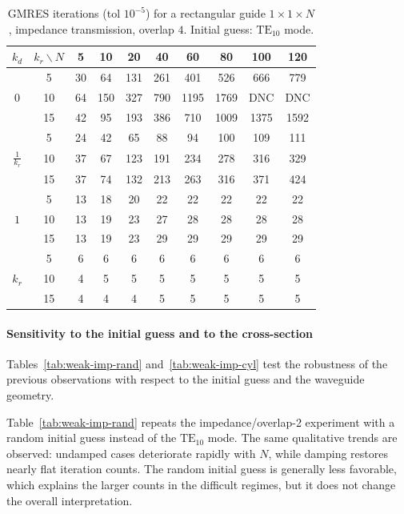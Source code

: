 \documentclass[smallextended]{svjour3}       %
\begin{document}
\begin{table}[h]
\centering
\setlength{\tabcolsep}{3pt}
\renewcommand{\arraystretch}{1.05}
\caption{GMRES iterations (tol \(10^{-5}\)) for a rectangular guide \(1\times 1\times N\),
impedance transmission, overlap \(4\). Initial guess: $\mathrm{TE}_{10}$ mode.}
\label{tab:weak-imp-o4}
\begin{tabular}{|c||c|c|c|c|c|c|c|c|c|}
\hline
$k_d$ & $ k_r \backslash N$ & 5 & 10 & 20 & 40 & 60 & 80 & 100 & 120 \\
\hline
 & 5 & 30 & 64 & 131 & 261 & 401 & 526 & 666 & 779 \\
$0$ & 10 & 64 & 150 & 327 & 790 & 1195 & 1769 & DNC & DNC \\
 & 15 & 42 & 95 & 193 & 386 & 710 & 1009 & 1375 & 1592 \\
\hline\hline
 & 5 & 24 & 42 & 65 & 88 & 94 & 100 & 109 & 111 \\
$\frac{1}{k_r}$ & 10 & 37 & 67 & 123 & 191 & 234 & 278 & 316 & 329 \\
 & 15 & 37 & 74 & 132 & 213 & 263 & 316 & 371 & 424 \\
\hline\hline
 & 5 & 13 & 18 & 20 & 22 & 22 & 22 & 22 & 22 \\
$1$ & 10 & 13 & 19 & 23 & 27 & 28 & 28 & 28 & 28 \\
 & 15 & 13 & 19 & 23 & 29 & 29 & 29 & 29 & 29 \\
\hline\hline
 & 5 & 6 & 6 & 6 & 6 & 6 & 6 & 6 & 6 \\
$k_r$ & 10 & 4 & 5 & 5 & 5 & 5 & 5 & 5 & 5 \\
 & 15 & 4 & 4 & 4 & 5 & 5 & 5 & 5 & 5 \\
\hline
\end{tabular}
\end{table}

\paragraph{Sensitivity to the initial guess and to the cross-section}
Tables~\ref{tab:weak-imp-rand} and~\ref{tab:weak-imp-cyl} test the robustness of the previous
observations with respect to the initial guess and the waveguide geometry.

Table~\ref{tab:weak-imp-rand} repeats the impedance/overlap-2 experiment with a random initial
guess instead of the \(\mathrm{TE}_{10}\) mode. The same qualitative trends are observed:
undamped cases deteriorate rapidly with \(N\), while damping restores nearly flat iteration
counts. The random initial guess is generally less favorable, which explains the larger counts in
the difficult regimes, but it does not change the overall interpretation.
\end{document}
